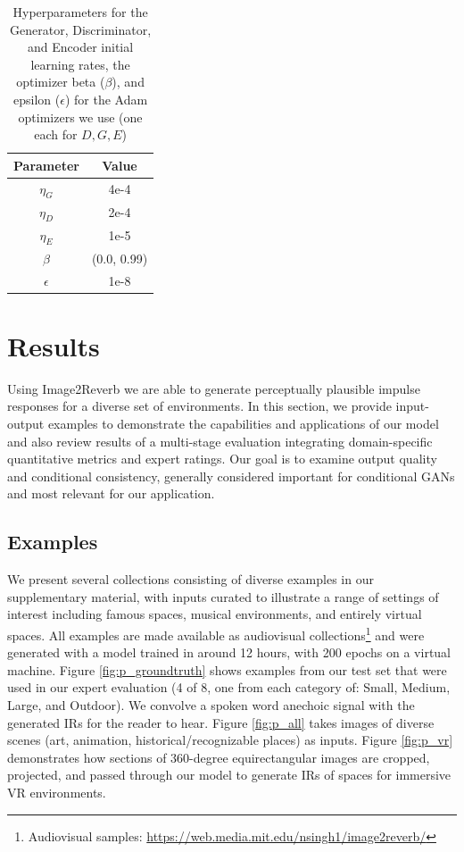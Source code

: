 \documentclass[10pt,twocolumn,letterpaper]{article}
\begin{document}
\begin{table}[ht]
    \small
    \centering
    \begin{tabular}{c|c}
        Parameter & Value\\
        \hline
        ${\eta_G}$ & 4e-4\\
        ${\eta_D}$ & 2e-4\\
        ${\eta_E}$ & 1e-5\\
        $\beta$ & (0.0, 0.99)\\
        $\epsilon$ & 1e-8\\
    \end{tabular}
    \caption{Hyperparameters for the Generator, Discriminator, and Encoder initial learning rates, the optimizer beta ($\beta$), and epsilon ($\epsilon$) for the Adam optimizers we use (one each for $D, G, E$)}
    \label{tab:hyperparameters}
\end{table}

\section{Results}
Using Image2Reverb we are able to generate perceptually plausible impulse responses for a diverse set of environments. In this section, we provide input-output examples to demonstrate the capabilities and applications of our model and also review results of a multi-stage evaluation integrating domain-specific quantitative metrics and expert ratings. Our goal is to examine output quality and conditional consistency, generally considered important for conditional GANs \cite{devries2020on} and most relevant for our application.

\subsection{Examples}
We present several collections consisting of diverse examples in our supplementary material, with inputs curated to illustrate a range of settings of interest including famous spaces, musical environments, and entirely virtual spaces. All examples are made available as audiovisual collections\footnote{Audiovisual samples: \href{https://web.media.mit.edu/~nsingh1/image2reverb/}{https://web.media.mit.edu/\raisebox{0.5ex}{\texttildelow}nsingh1/image2reverb/}} and were generated with a model trained in around 12 hours, with 200 epochs on a virtual machine. Figure \ref{fig:p_groundtruth} shows examples from our test set that were used in our expert evaluation (4 of 8, one from each category of: Small, Medium, Large, and Outdoor). We convolve a spoken word anechoic signal with the generated IRs for the reader to hear. Figure \ref{fig:p_all} takes images of diverse scenes (art, animation, historical/recognizable places) as inputs. Figure \ref{fig:p_vr} demonstrates how sections of 360-degree equirectangular images are cropped, projected, and passed through our model to generate IRs of spaces for immersive VR environments.
\end{document}
